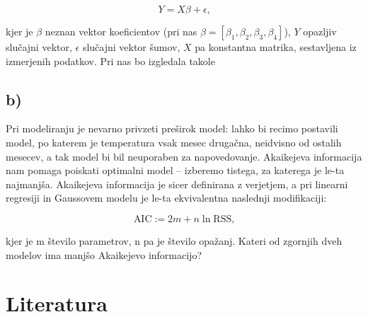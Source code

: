 \documentclass[12pt, a4paper]{article}
\begin{document}
$$ Y = X\beta + \epsilon \text{,}
$$

kjer je $\beta$ neznan vektor koeficientov (pri nas $\beta = [\beta_1, \beta_2, \beta_3,
\beta_4]$), $Y$ opazljiv slučajni vektor, $\epsilon$ slučajni vektor šumov, 
$X$ pa konstantna matrika, sestavljena iz izmerjenih podatkov. Pri nas bo 
izgledala takole




\subsection*{b)}
Pri modeliranju je nevarno privzeti preširok model: lahko bi recimo postavili
model, po katerem je temperatura vsak mesec drugačna, neidvisno od ostalih
mesecev, a tak model bi bil neuporaben za napovedovanje. Akaikejeva 
informacija nam pomaga poiskati optimalni model – izberemo tistega, za katerega
je le-ta najmanjša. Akaikejeva informacija je sicer definirana z verjetjem, 
a pri linearni regresiji in Gaussovem modelu je le-ta ekvivalentna naslednji 
modifikaciji:  

\[
    \text{AIC} := 2m + n \ln \text{RSS,}
    \]

kjer je m število parametrov, n pa je število opažanj. Kateri od zgornjih dveh
modelov ima manjšo Akaikejevo informacijo?



\section*{Literatura}
\end{document}
